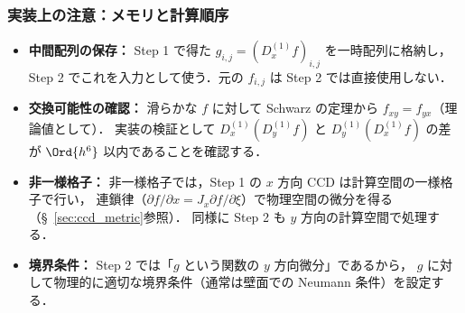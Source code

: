 \medskip

\subsubsection{実装上の注意：メモリと計算順序}

\begin{tcolorbox}[warnbox, title={混合微分実装の落とし穴}]
\begin{itemize}
  \item \textbf{中間配列の保存：} Step 1 で得た $g_{i,j} = (D_x^{(1)} f)_{i,j}$ を一時配列に格納し，
        Step 2 でこれを入力として使う．元の $f_{i,j}$ は Step 2 では直接使用しない．
  \item \textbf{交換可能性の確認：} 滑らかな $f$ に対して Schwarz の定理から $f_{xy} = f_{yx}$（理論値として）．
        実装の検証として $D_x^{(1)}(D_y^{(1)} f)$ と $D_y^{(1)}(D_x^{(1)} f)$ の差が $\Ord{h^6}$ 以内であることを確認する．
  \item \textbf{非一様格子：} 非一様格子では，Step 1 の $x$ 方向 CCD は計算空間の一様格子で行い，
        連鎖律（$\partial f/\partial x = J_x \partial f/\partial\xi$）で物理空間の微分を得る（§~\ref{sec:ccd_metric}参照）．
        同様に Step 2 も $y$ 方向の計算空間で処理する．
  \item \textbf{境界条件：} Step 2 では「$g$ という関数の $y$ 方向微分」であるから，
        $g$ に対して物理的に適切な境界条件（通常は壁面での Neumann 条件）を設定する．
\end{itemize}
\end{tcolorbox}

